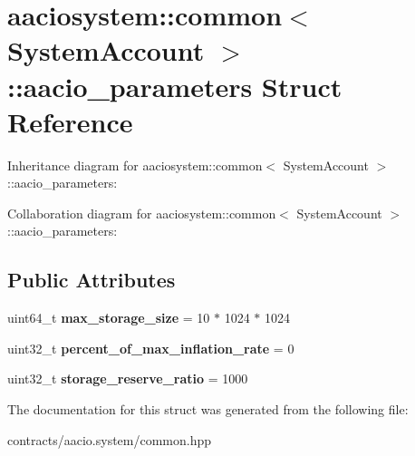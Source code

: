 \hypertarget{structaaciosystem_1_1common_1_1aacio__parameters}{}\section{aaciosystem\+:\+:common$<$ System\+Account $>$\+:\+:aacio\+\_\+parameters Struct Reference}
\label{structaaciosystem_1_1common_1_1aacio__parameters}


Inheritance diagram for aaciosystem\+:\+:common$<$ System\+Account $>$\+:\+:aacio\+\_\+parameters\+:


Collaboration diagram for aaciosystem\+:\+:common$<$ System\+Account $>$\+:\+:aacio\+\_\+parameters\+:
\subsection*{Public Attributes}
\begin{DoxyCompactItemize}
\item 
\mbox{\label{structaaciosystem_1_1common_1_1aacio__parameters_a9659529fc2f451824785609b7b7a4320}} 
uint64\+\_\+t {\bfseries max\+\_\+storage\+\_\+size} = 10 $\ast$ 1024 $\ast$ 1024
\item 
\mbox{\label{structaaciosystem_1_1common_1_1aacio__parameters_a453348e2a080dde9fe82436d5ae8bbb3}} 
uint32\+\_\+t {\bfseries percent\+\_\+of\+\_\+max\+\_\+inflation\+\_\+rate} = 0
\item 
\mbox{\label{structaaciosystem_1_1common_1_1aacio__parameters_a8ed88174ddfce44d363035e0445aec8d}} 
uint32\+\_\+t {\bfseries storage\+\_\+reserve\+\_\+ratio} = 1000
\end{DoxyCompactItemize}


The documentation for this struct was generated from the following file\+:\begin{DoxyCompactItemize}
\item 
contracts/aacio.\+system/common.\+hpp\end{DoxyCompactItemize}
